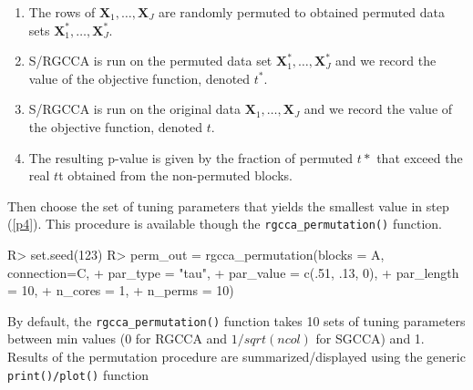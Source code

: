 \documentclass[
]{jss}
\begin{document}
\begin{enumerate}
\item [\label{p1}] The rows of $\mathbf X_1, \ldots, \mathbf X_J$ are
randomly permuted to obtained permuted data sets $\mathbf X_1^*, \ldots, \mathbf X_J^*$.

\item [\label{p2}] S/RGCCA is run on the permuted data set
$\mathbf X_1^*, \ldots, \mathbf X_J^*$ and we record the value of the 
objective function, denoted $t^*$.

\item [\label{p3}]  S/RGCCA is run on the original data 
$\mathbf X_1, \ldots, \mathbf X_J$ and we record the value of the objective 
function, denoted $t$.

\item [\label{p4}]  The resulting p-value is given by the fraction of permuted
$t*$ that exceed the real $t$t obtained from the non-permuted blocks.
\end{enumerate}

Then choose the set of tuning parameters that yields the smallest value
in step (\ref{p4}). This procedure is available though the
\texttt{rgcca\_permutation()} function.

\footnotesize

\begin{CodeChunk}
\begin{CodeInput}
R> set.seed(123)
R> perm_out = rgcca_permutation(blocks = A, connection=C, 
+                              par_type = "tau",
+                              par_value = c(.51, .13, 0),
+                              par_length = 10,
+                              n_cores = 1,
+                              n_perms = 10)
\end{CodeInput}
\end{CodeChunk}

\normalsize

By default, the \texttt{rgcca\_permutation()} function takes 10 sets of
tuning parameters between min values (0 for RGCCA and \(1/sqrt(ncol)\)
for SGCCA) and 1. Results of the permutation procedure are
summarized/displayed using the generic \texttt{print()/plot()} function

\footnotesize
\end{document}
